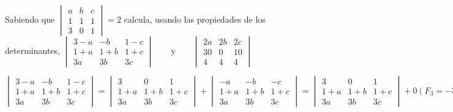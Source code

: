 \begin{ejemplo}
 Sabiendo que 
 $ \begin{vmatrix}
 a & b & c \\
 1 & 1 & 1 \\
 3 & 0 & 1
 \end{vmatrix}= 2 $
 calcula, usando las propiedades de los determinantes,
$ \begin{vmatrix}
 3-a & -b & 1-c \\
 1+a & 1+b & 1+c \\
 3a & 3b & 3c 
 \end{vmatrix}
 \qquad \text{y} \qquad 
 \begin{vmatrix}
  2a & 2b & 2c \\
 30 & 0 & 10 \\
  4 & 4 & 4
 \end{vmatrix} $

\tcblower
$
\begin{vmatrix}
 3-a & -b & 1-c \\
 1+a & 1+b & 1+c \\
 3a & 3b & 3c 
 \end{vmatrix}
 = 
 \begin{vmatrix}
 3 & 0 & 1 \\
 1+a & 1+b & 1+c \\
 3a & 3b & 3c 
 \end{vmatrix}+\begin{vmatrix}
 -a & -b & -c \\
 1+a & 1+b & 1+c \\
 3a & 3b & 3c 
 \end{vmatrix} =  
 \begin{vmatrix}
 3 & 0 & 1 \\
 1+a & 1+b & 1+c \\
 3a & 3b & 3c 
 \end{vmatrix} +  0 (F_3=-3F_1)
 = 
 \begin{vmatrix}
 3 & 0 & 1 \\
 1 & 1 & 1 \\
 3a & 3b & 3c 
 \end{vmatrix}+ \begin{vmatrix}
 3 & 0 & 1 \\
 a & b & c \\
 3a & 3b & 3c 
 \end{vmatrix} 
\begin{vmatrix}
 3 & 0 & 1 \\
 1 & 1 & 1 \\
 3a & 3b & 3c 
 \end{vmatrix}+  0 (F_3=3F_2)
  = 3\begin{vmatrix}
 3 & 0 & 1 \\
 1 & 1 & 1 \\
 a & b & c 
 \end{vmatrix}
= -3 \begin{vmatrix}
 a & b & c\\
 1 & 1 & 1 \\
   3 & 0 & 1
 \end{vmatrix} = -6 $


\end{ejemplo}
